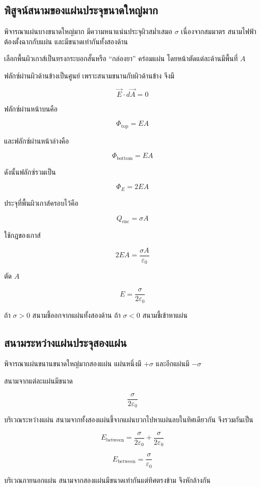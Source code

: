 \subsection{พิสูจน์สนามของแผ่นประจุขนาดใหญ่มาก}

พิจารณาแผ่นบางขนาดใหญ่มาก มีความหนาแน่นประจุผิวสม่ำเสมอ $\sigma$ เนื่องจากสมมาตร สนามไฟฟ้าต้องตั้งฉากกับแผ่น และมีขนาดเท่ากันทั้งสองด้าน

เลือกพื้นผิวเกาส์เป็นทรงกระบอกสั้นหรือ ``กล่องยา'' คร่อมแผ่น โดยหน้าตัดแต่ละด้านมีพื้นที่ $A$

ฟลักซ์ผ่านผิวด้านข้างเป็นศูนย์ เพราะสนามขนานกับผิวด้านข้าง จึงมี

\[
\vec{E}\cdot d\vec{A}=0
\]

ฟลักซ์ผ่านหน้าบนคือ

\[
\Phi_{\text{top}}=EA
\]

และฟลักซ์ผ่านหน้าล่างคือ

\[
\Phi_{\text{bottom}}=EA
\]

ดังนั้นฟลักซ์รวมเป็น

\[
\Phi_E=2EA
\]

ประจุที่พื้นผิวเกาส์ครอบไว้คือ

\[
Q_{\text{enc}}=\sigma A
\]

ใช้กฎของเกาส์

\[
2EA=\frac{\sigma A}{\varepsilon_0}
\]

ตัด $A$

\[
\boxed{E=\frac{\sigma}{2\varepsilon_0}}
\]

ถ้า $\sigma>0$ สนามชี้ออกจากแผ่นทั้งสองด้าน ถ้า $\sigma<0$ สนามชี้เข้าหาแผ่น

\subsection{สนามระหว่างแผ่นประจุสองแผ่น}

พิจารณาแผ่นขนานขนาดใหญ่มากสองแผ่น แผ่นหนึ่งมี $+\sigma$ และอีกแผ่นมี $-\sigma$

สนามจากแต่ละแผ่นมีขนาด

\[
\frac{\sigma}{2\varepsilon_0}
\]

บริเวณระหว่างแผ่น สนามจากทั้งสองแผ่นชี้จากแผ่นบวกไปหาแผ่นลบในทิศเดียวกัน จึงรวมกันเป็น

\[
E_{\text{between}}
=
\frac{\sigma}{2\varepsilon_0}
+
\frac{\sigma}{2\varepsilon_0}
\]

\[
\boxed{E_{\text{between}}=\frac{\sigma}{\varepsilon_0}}
\]

บริเวณภายนอกแผ่น สนามจากสองแผ่นมีขนาดเท่ากันแต่ทิศตรงข้าม จึงหักล้างกัน


